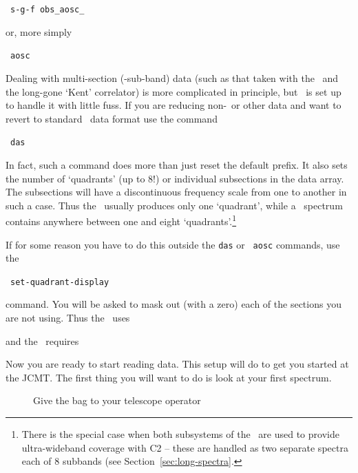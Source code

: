 \SP\ {\tt s-g-f obs\_aosc\_}

or, more simply

\SP\ {\tt aosc}

Dealing with multi-section (-sub-band) data (such as that taken with the
\das\ and the long-gone `Kent' correlator) is more complicated in
principle, but \SPECX\ is set up to handle it with little fuss. If you are
reducing non-\das\ or other data and want to revert to standard \das\ data
format use the command

\SP\ {\tt das}

In fact, such a command does more than just reset the default prefix. It
also sets the number of `quadrants' (up to 8!) or individual subsections
in the data array. The subsections will have a discontinuous frequency
scale from one to another in such a case. Thus the \aosc\ usually produces
only one `quadrant', while a \das\ spectrum contains anywhere between one
and eight `quadrants'.\footnote{There is the special case when both
subsystems of the \das\ are used to provide ultra-wideband coverage with
C2 -- these are handled as two separate spectra each of 8 subbands (see
Section~\ref{sec:long-spectra}.}

If for some reason you have to do this outside the {\tt das} or {\tt
aosc} commands, use the

\SP\ {\tt set-quadrant-display} 

command. You will be asked to mask out (with a zero) each of the sections you 
are not using. Thus the \das\ uses


and the \aosc\ requires

\myline

Now you are ready to start reading data. This setup will do to get you
started at the JCMT. The first thing you will want to do is look at
your first spectrum.

\begin{figure}[htb]
\centering
\leavevmode
\epsfxsize=6.0in
\vspace*{-0.5cm}
\begin{center}
\begin{minipage}[t]{5.5in}
\caption[Getting plots out]
{\small{Give the bag to your telescope operator}}
\label{fig:duffy}
\end{minipage}
\end{center}
\end{figure}

